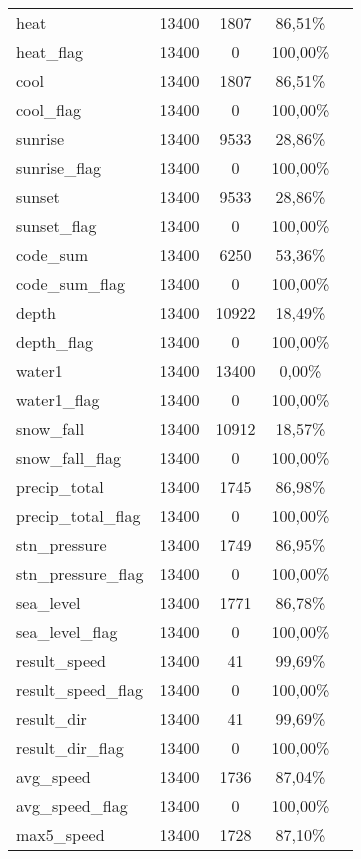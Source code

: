 \begin{longtable}{lcccc}
		heat				& 13400 & 1807	     & 86,51\%  	\\
		heat\_flag			& 13400 & 0		     & 100,00\% 	\\	
		cool				& 13400 & 1807	     & 86,51\%  	\\
		cool\_flag			& 13400 & 0		     & 100,00\% 	\\	
		sunrise				& 13400 & 9533	     & 28,86\%  	\\
		sunrise\_flag		& 13400 & 0		     & 100,00\% 	\\	
		sunset				& 13400 & 9533	     & 28,86\%  	\\
		sunset\_flag		& 13400 & 0		     & 100,00\% 	\\	
		code\_sum			& 13400 & 6250	     & 53,36\%  	\\
		code\_sum\_flag		& 13400 & 0		     & 100,00\% 	\\	
		depth				& 13400 & 10922		 & 18,49\%  	\\
		depth\_flag			& 13400 & 0		   	 & 100,00\%		\\	
		water1				& 13400 & 13400		 & 0,00\%		\\
		water1\_flag		& 13400 & 0		   	 & 100,00\%		\\	
		snow\_fall			& 13400 & 10912		 & 18,57\%		\\	
		snow\_fall\_flag	& 13400 & 0		   	 & 100,00\%		\\		
		precip\_total		& 13400 & 1745		 & 86,98\%		\\	
		precip\_total\_flag	& 13400 & 0		   	 & 100,00\%		\\		
		stn\_pressure		& 13400 & 1749		 & 86,95\%		\\	
		stn\_pressure\_flag	& 13400 & 0		   	 & 100,00\%		\\		
		sea\_level			& 13400 & 1771		 & 86,78\%		\\	
		sea\_level\_flag	& 13400 & 0		   	 & 100,00\%		\\		
		result\_speed		& 13400 & 41		 & 99,69\%		\\	
		result\_speed\_flag	& 13400 & 0		   	 & 100,00\%		\\		
		result\_dir			& 13400 & 41		 & 99,69\%		\\			
		result\_dir\_flag	& 13400 & 0		   	 & 100,00\%		\\		
		avg\_speed			& 13400 & 1736		 & 87,04\%		\\	
		avg\_speed\_flag	& 13400 & 0		   	 & 100,00\%		\\		
		max5\_speed			& 13400 & 1728		 & 87,10\%		\\	

\end{longtable}
